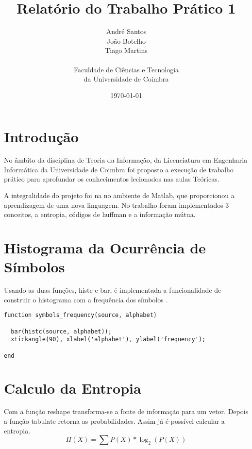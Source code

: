 \documentclass[11pt]{article}
\title{\textbf{Relatório do Trabalho Prático 1}}
\author{André Santos\\João Botelho\\Tiago Martins\\\\ Faculdade de Ciências e Tecnologia \\da Universidade de Coimbra}
\date{\today}
\begin{document}
\maketitle 




\tableofcontents
\newpage
\section{Introdução}
No âmbito da disciplina de Teoria da Informação, da Licenciatura em Engenharia Informática da Universidade de Coimbra foi proposto a execução de trabalho prático para aprofundar os conhecimentos lecionados nas aulas Teóricas.
\par
A integralidade do projeto foi na no ambiente de Matlab, que proporcionou a aprendizagem de uma nova linguagem. No trabalho foram implementados 3 conceitos, a entropia, códigos de huffman e a informação mútua.

\section{Histograma da Ocurrência de Símbolos}
Usando as duas funções, histc e bar, é implementada a funcionalidade de construir o histograma com a frequência dos símbolos .
\begin{lstlisting}
function symbols_frequency(source, alphabet)

  bar(histc(source, alphabet));
  xtickangle(90), xlabel('alphabet'), ylabel('frequency');

end
\end{lstlisting}

\section{Calculo da Entropia}
\par Com a função reshape transforma-se a fonte de informação para um vetor. Depois a função tabulate retorna as probabilidades. Assim já é possível calcular a entropia.
\begin{equation}
H(X) = \sum_{}P(X) * \log_2(P(X))
\end{equation}
\end{document}

